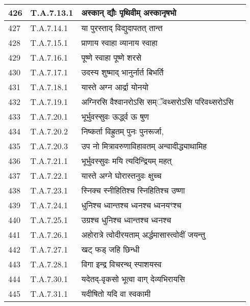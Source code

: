\documentclass[17pt]{extarticle}
\begin{document}
\begin{longtable}{||p{0.4in}||p{0.9in}||p{4.0in}||p{0.9in}||}
        \hline
            426 & T.A.7.13.1 & अस्कान् द्यौः पृथिवीम् अस्कानृषभो &      \\
        \hline
            427 & T.A.7.14.1 & या पुरस्ताद् विद्युदापतत् तान्त &      \\
        \hline
            428 & T.A.7.15.1 & प्राणाय स्वाहा व्यानाय स्वाहा &      \\
        \hline
            429 & T.A.7.16.1 & पूष्णे स्वाहा पूष्णे शरसे &      \\
        \hline
            430 & T.A.7.17.1 & उदस्य शुष्माद् भानुर्नार्त बिभर्ति &      \\
        \hline
            431 & T.A.7.18.1 & यास्ते अग्न आर्द्रा योनयो &      \\
        \hline
            432 & T.A.7.19.1 & अग्निरसि वैश्वानरोऽसि सम्ॅवथ्सरोऽसि परिवथ्सरोऽसि &      \\
        \hline
            433 & T.A.7.20.1 & भूर्भुवस्सुवः ऊर्द्ध्व ऊ षुण &      \\
        \hline
            434 & T.A.7.20.2 & निष्कर्ता विह्रुतम् पुनः पुनरूर्जा, &      \\
        \hline
            435 & T.A.7.20.3 & उप नो मित्रावरुणाविहावतम् अन्वादीद्ध्याथामिह &      \\
        \hline
            436 & T.A.7.21.1 & भूर्भुवस्सुवः मयि त्यदिन्द्रियम् महत् &      \\
        \hline
            437 & T.A.7.22.1 & यास्ते अग्ने घोरास्तनुवः क्षुच्च &      \\
        \hline
            438 & T.A.7.23.1 & स्निक्च स्नीहितिश्च स्निहितिश्च उष्णा &      \\
        \hline
            439 & T.A.7.24.1 & धुनिश्च ध्वान्तश्च ध्वनश्च ध्वनयꣳश्च &      \\
        \hline
            440 & T.A.7.25.1 & उग्रश्च धुनिश्च ध्वान्तश्च ध्वनश्च &      \\
        \hline
            441 & T.A.7.26.1 & अहोरात्रे त्वोदीरयताम् अर्द्धमासास्त्वोदीं जयन्तु &      \\
        \hline
            442 & T.A.7.27.1 & खट् फड् जहि छिन्धी &      \\
        \hline
            443 & T.A.7.28.1 & विगा इन्द्र विचरन्थ् स्पाशयस्व &      \\
        \hline
            444 & T.A.7.30.1 & यदेतद्{-}वृकसो भूत्वा वाग् देव्यभिरायसि &      \\
        \hline
            445 & T.A.7.31.1 & यदीषितो यदि वा स्वकामी &      \\

\end{longtable}
\end{document}
